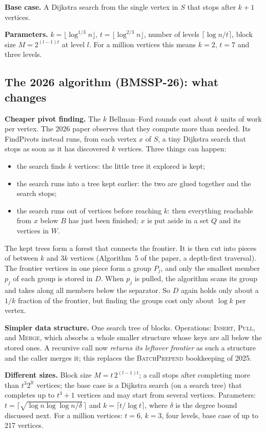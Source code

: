 \documentclass[11pt,a4paper]{article}
\newcommand{\bmB}{BMSSP-26}
\begin{document}
\textbf{Base case.} A Dijkstra search from the single vertex in $S$ that stops after $k+1$ vertices.

\textbf{Parameters.} $k=\lfloor\log^{1/3}n\rfloor$, $t=\lfloor\log^{2/3}n\rfloor$, number of levels $\lceil\log n/t\rceil$, block size $M=2^{(l-1)t}$ at level $l$. For a million vertices this means $k=2$, $t=7$ and three levels.

\subsection{The 2026 algorithm (\bmB): what changes}
\textbf{Cheaper pivot finding.} The $k$ Bellman--Ford rounds cost about $k$ units of work per vertex. The 2026 paper observes that they compute more than needed. Its FindPivots instead runs, from each vertex $x$ of $S$, a tiny Dijkstra search that stops as soon as it has discovered $k$ vertices. Three things can happen:
\begin{itemize}
\item the search finds $k$ vertices: the little tree it explored is kept;
\item the search runs into a tree kept earlier: the two are glued together and the search stops;
\item the search runs out of vertices before reaching $k$: then everything reachable from $x$ below $B$ has just been finished; $x$ is put aside in a set $Q$ and its vertices in $W$.
\end{itemize}
The kept trees form a forest that connects the frontier. It is then cut into pieces of between $k$ and $3k$ vertices (Algorithm~5 of the paper, a depth-first traversal). The frontier vertices in one piece form a group $P_j$, and only the smallest member $p_j$ of each group is stored in $D$. When $p_j$ is pulled, the algorithm scans its group and takes along all members below the separator. So $D$ again holds only about a $1/k$ fraction of the frontier, but finding the groups cost only about $\log k$ per vertex.

\textbf{Simpler data structure.} One search tree of blocks. Operations: \textsc{Insert}, \textsc{Pull}, and \textsc{Merge}, which absorbs a whole smaller structure whose keys are all below the stored ones. A recursive call now \emph{returns its leftover frontier} as such a structure and the caller merges it; this replaces the \textsc{BatchPrepend} bookkeeping of 2025.

\textbf{Different sizes.} Block size $M=t\,2^{(l-1)t}$; a call stops after completing more than $t^3 2^{lt}$ vertices; the base case is a Dijkstra search (on a search tree) that completes up to $t^3+1$ vertices and may start from several vertices. Parameters: $t=\lceil\sqrt{\log n\log\log n/\delta}\,\rceil$ and $k=\lceil t/\log t\rceil$, where $\delta$ is the degree bound discussed next. For a million vertices: $t=6$, $k=3$, four levels, base case of up to 217 vertices.
\end{document}
